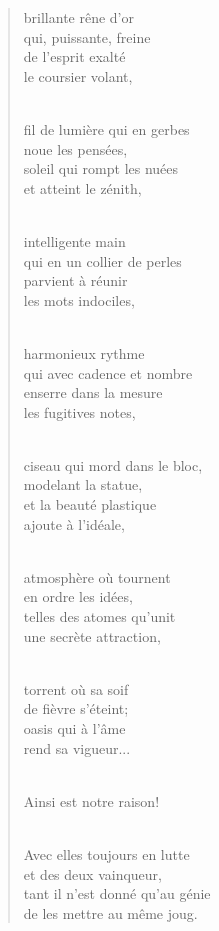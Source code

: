 \documentclass[a4paper,11pt]{book}
\begin{document}
\begin{verse}
brillante rêne d'or \\
qui, puissante, freine \\
de l'esprit exalté \\
le coursier volant, \\ \

fil de lumière qui en gerbes \\
noue les pensées, \\
soleil qui rompt les nuées \\
et atteint le zénith, \\ \

intelligente main \\
qui en un collier de perles \\
parvient à réunir \\
les mots indociles, \\ \

harmonieux rythme \\
qui avec cadence et nombre \\
enserre dans la mesure \\
les fugitives notes, \\ \

ciseau qui mord dans le bloc, \\
modelant la statue, \\
et la beauté plastique \\
ajoute à l'idéale, \\ \

atmosphère où tournent \\
en ordre les idées, \\
telles des atomes qu'unit \\
une secrète attraction, \\ \

torrent où sa soif \\
de fièvre s'éteint; \\
oasis qui à l'âme \\
rend sa vigueur... \\ \

Ainsi est notre raison! \\ \

Avec elles toujours en lutte \\
et des deux vainqueur, \\
tant il n'est donné qu'au génie \\
de les mettre au même joug. \\
\end{verse}
\end{document}
